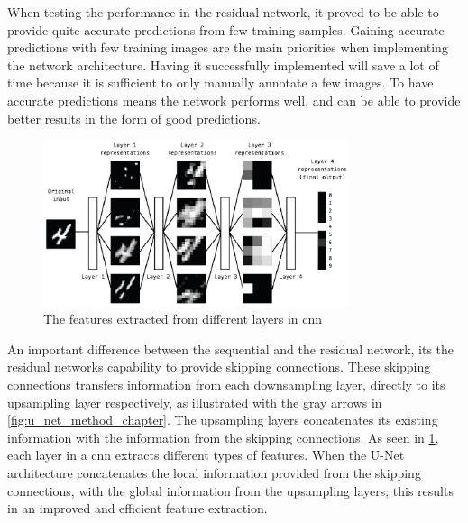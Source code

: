 \documentclass[USenglish]{ifimaster}  %
\begin{document}
When testing the performance in the residual network, it proved to be able to provide quite accurate predictions from few training samples. Gaining accurate predictions with few training images are the main priorities when implementing the network architecture. Having it successfully implemented will save a lot of time because it is sufficient to only manually annotate a few images. To have accurate predictions means the network performs well, and can be able to provide better results in the form of good predictions. 

\begin{figure}[ht]
    \centering
    \includegraphics[width=0.8\textwidth]{bilder/layers_features.png}
    \caption{The features extracted from different layers in \ac{cnn} \cite{Francois_Deep_learning_with_python}}
    \label{fig:layers_features}
\end{figure}

An important difference between the sequential and the residual network, its the residual networks capability to provide skipping connections. These skipping connections transfers information from each downsampling layer, directly to its upsampling layer respectively, as illustrated with the gray arrows in \cref{fig:u_net_method_chapter}. The upsampling layers concatenates its existing information with the information from the skipping connections. As seen in \cref{fig:layers_features}, each layer in a \ac{cnn} extracts different types of features. When the U-Net architecture concatenates the local information provided from the skipping connections, with the global information from the upsampling layers; this results in an improved and efficient feature extraction.  
\end{document}
